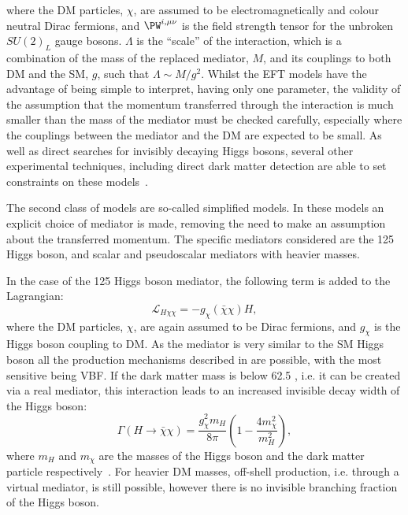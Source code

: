 where the \ac{DM} particles, $\chi$, are assumed to be electromagnetically and colour neutral Dirac fermions, and $\PW^{i,\mu\nu}$ is the field strength tensor for the unbroken $SU\left(2\right)_{L}$ gauge bosons. $\Lambda$ is the ``scale'' of the interaction, which is a combination of the mass of the replaced mediator, $M$, and its couplings to both \ac{DM} and the \ac{SM}, $g$, such that $\Lambda\sim M/g^{2}$. Whilst the \ac{EFT} models have the advantage of being simple to interpret, having only one parameter, the validity of the assumption that the momentum transferred through the interaction is much smaller than the mass of the mediator must be checked carefully, especially where the couplings between the mediator and the \ac{DM} are expected to be small. As well as direct searches for invisibly decaying Higgs bosons, several other experimental techniques, including direct dark matter detection are able to set constraints on these models~\cite{ourdmpaper}.%

The second class of models are so-called simplified models. In these models an explicit choice of mediator is made, removing the need to make an assumption about the transferred momentum. The specific mediators considered are the 125 \GeV Higgs boson, and scalar and pseudoscalar mediators with heavier masses.

In the case of the 125 \GeV Higgs boson mediator, the following term is added to the Lagrangian:
\begin{equation}
  \mathcal{L}_{H\chi\chi}=-g_{\chi}\left(\bar{\chi}\chi\right)H,
\end{equation}
where the \ac{DM} particles, $\chi$, are again assumed to be Dirac fermions, and $g_{\chi}$ is the Higgs boson coupling to \ac{DM}. As the mediator is very similar to the \ac{SM} Higgs boson all the production mechanisms described in  are possible, with the most sensitive being \ac{VBF}. If the dark matter mass is below 62.5 \GeV, i.e. it can be created via a real mediator, this interaction leads to an increased invisible decay width of the Higgs boson:
\begin{equation}
  \label{eq:offshellsmhiggs}
  \Gamma\left(H\rightarrow\bar{\chi}\chi\right)=\frac{g_{\chi}^{2}m_{H}}{8\pi}\left(1-\frac{4m_{\chi}^{2}}{m_{H}^{2}}\right),
\end{equation}
where $m_{H}$ and $m_{\chi}$ are the masses of the Higgs boson and the dark matter particle respectively~\cite{ourdmpaper}. For heavier \ac{DM} masses, off-shell production, i.e. through a virtual mediator, is still possible, however there is no invisible branching fraction of the Higgs boson.

